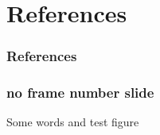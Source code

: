 \documentclass[fleqn]{beamer}
\begin{document}
    
    \section{References}
    
    \begin{frame}[t,allowframebreaks]\label{lastframe}
        \frametitle{References}
        
        
    \end{frame}
    
    \beginbackup %
    
    \begin{frame}[noframenumbering]
        \frametitle{no frame number slide}
        \begin{center}
            Some words and test figure
        \end{center}
    \end{frame}
    
    \backupend %
    
\end{document}
